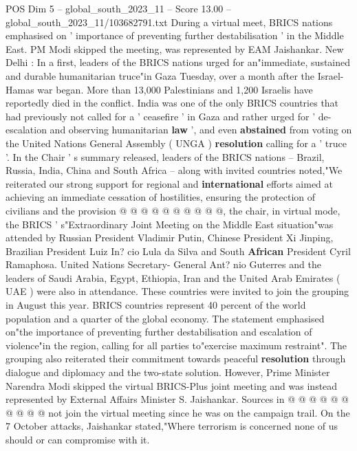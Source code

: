\begin{textsample}{POS Dim 5 – global\_south\_2023\_11 – Score 13.00 – global\_south\_2023\_11/103682791.txt}  \label{ex:f5_pos_255}
During a virtual meet, BRICS nations emphasised on ' importance of preventing further destabilisation ' in the Middle East.
PM Modi skipped the meeting, was represented by EAM Jaishankar.
New Delhi : In a first, leaders of the BRICS nations urged for an"immediate, sustained and durable humanitarian truce"in Gaza Tuesday, over a month after the Israel-Hamas war began.
More than 13,000 Palestinians and 1,200 Israelis have reportedly died in the conflict.
India was one of the only BRICS countries that had previously not called for a ' ceasefire ' in Gaza and rather urged for ' de-escalation and observing humanitarian \textbf{law} ', and even \textbf{abstained} from voting on the United Nations General Assembly ( UNGA ) \textbf{resolution} calling for a ' truce '.
In the Chair ' s summary released, leaders of the BRICS nations -- Brazil, Russia, India, China and South Africa -- along with invited countries noted,"We reiterated our strong support for regional and \textbf{international} efforts aimed at achieving an immediate cessation of hostilities, ensuring the protection of civilians and the provision @ @ @ @ @ @ @ @ @ @, the chair, in virtual mode, the BRICS ' s"Extraordinary Joint Meeting on the Middle East situation"was attended by Russian President Vladimir Putin, Chinese President Xi Jinping, Brazilian President Luiz In? cio Lula da Silva and South \textbf{African} President Cyril Ramaphosa.
United Nations Secretary- General Ant? nio Guterres and the leaders of Saudi Arabia, Egypt, Ethiopia, Iran and the United Arab Emirates ( UAE ) were also in attendance.
These countries were invited to join the grouping in August this year.
BRICS countries represent 40 percent of the world population and a quarter of the global economy.
The statement emphasised on"the importance of preventing further destabilisation and escalation of violence"in the region, calling for all parties to"exercise maximum restraint".
The grouping also reiterated their commitment towards peaceful \textbf{resolution} through dialogue and diplomacy and the two-state solution.
However, Prime Minister Narendra Modi skipped the virtual BRICS-Plus joint meeting and was instead represented by External Affairs Minister S.
Jaishankar.
Sources in @ @ @ @ @ @ @ @ @ @ not join the virtual meeting since he was on the campaign trail.
On the 7 October attacks, Jaishankar stated,"Where terrorism is concerned none of us should or can compromise with it.

\end{textsample}
